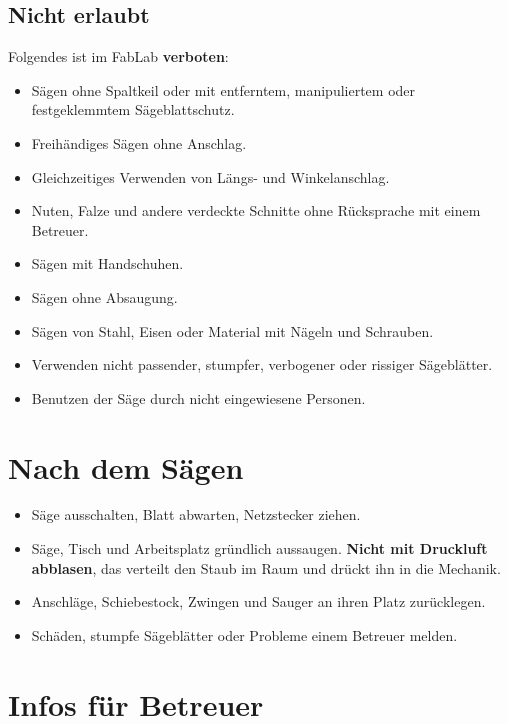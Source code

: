 \documentclass{\basedir/fablab-document}
\begin{document}
	\subsection{Nicht erlaubt}
	Folgendes ist im FabLab \textbf{verboten}:
	\begin{itemize}
		\item Sägen ohne Spaltkeil oder mit entferntem, manipuliertem oder festgeklemmtem Sägeblattschutz.
		\item Freihändiges Sägen ohne Anschlag.
		\item Gleichzeitiges Verwenden von Längs- und Winkelanschlag.
		\item Nuten, Falze und andere verdeckte Schnitte ohne Rücksprache mit einem Betreuer.
		\item Sägen mit Handschuhen.
		\item Sägen ohne Absaugung.
		\item Sägen von Stahl, Eisen oder Material mit Nägeln und Schrauben.
		\item Verwenden nicht passender, stumpfer, verbogener oder rissiger Sägeblätter.
		\item Benutzen der Säge durch nicht eingewiesene Personen.
	\end{itemize}

	\section{Nach dem Sägen}

	\begin{itemize}
		\item Säge ausschalten, Blatt abwarten, Netzstecker ziehen.
		\item Säge, Tisch und Arbeitsplatz gründlich aussaugen. \textbf{Nicht mit Druckluft abblasen}, das verteilt den Staub im Raum und drückt ihn in die Mechanik.
		\item Anschläge, Schiebestock, Zwingen und Sauger an ihren Platz zurücklegen.
		\item Schäden, stumpfe Sägeblätter oder Probleme einem Betreuer melden.
	\end{itemize}

	\section{Infos für Betreuer}
\end{document}
